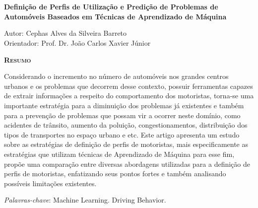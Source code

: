 \chapter*{}
\begin{center}
	{\Large{\textbf{Definição de Perfis de Utilização e Predição de Problemas de Automóveis Baseados em Técnicas de Aprendizado de Máquina
}}}
\end{center}

\vspace{1cm}

\begin{flushright}
	Autor: Cephas Alves da Silveira Barreto\\
	Orientador: Prof. Dr. João Carlos Xavier Júnior
\end{flushright}

\vspace{1cm}

\begin{center}
	\Large{\textsc{\textbf{Resumo}}}
\end{center}

\noindent Considerando o incremento no número de automóveis nos grandes centros urbanos e os problemas que decorrem desse contexto, possuir ferramentas capazes de extrair informações a respeito do comportamento dos motoristas, torna-se uma importante estratégia para a diminuição dos problemas já existentes e também para a prevenção de problemas que possam vir a ocorrer neste domínio, como acidentes de trânsito, aumento da poluição, congestionamentos, distribuição dos tipos de transportes no espaço urbano e etc. Este artigo apresenta um estudo sobre as estratégias de definição de perfis de motoristas, mais especificamente as estratégias que utilizam técnicas de Aprendizado de Máquina para esse fim, propõe uma comparação entre diversas abordagens utilizadas para a definição de perfis de motoristas, enfatizando seus pontos fortes e também analisando possíveis limitações existentes.

\noindent\textit{Palavras-chave}: Machine Learning. Driving Behavior.





 
